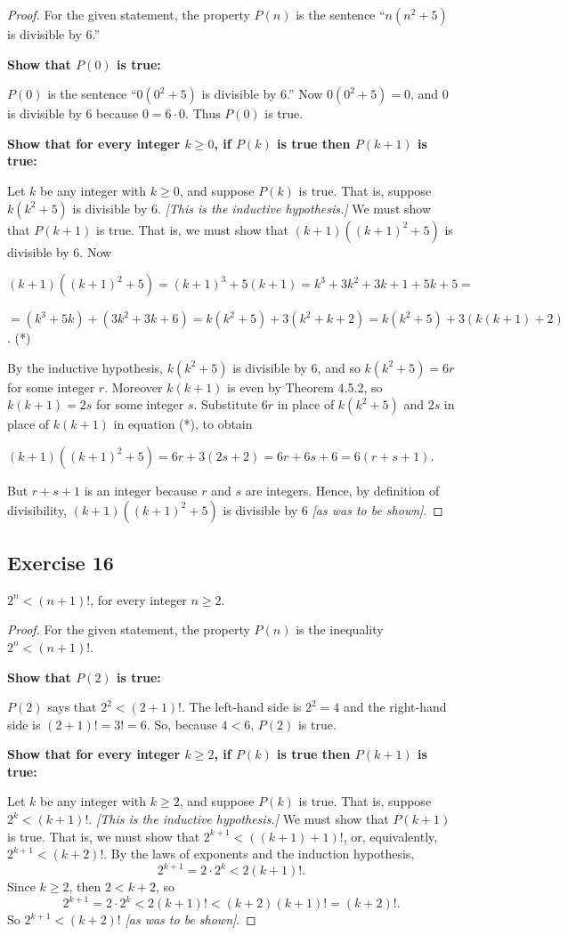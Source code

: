 \documentclass[14pt]{extarticle}
\begin{document}
\begin{proof}
For the given statement, the property $P(n)$ is the sentence “$n(n^2 + 5)$ is divisible by 6.” 

{\bf Show that $P(0)$ is true:} 

$P(0)$ is the sentence “$0(0^2 + 5)$ is divisible by 6.” Now $0(0^2 + 5) = 0$, and 0 is divisible by 6 because $0 = 6 \cdot 0$. Thus $P(0)$ is true. 

{\bf Show that for every integer $k \geq 0$, if $P(k)$ is true then $P(k + 1)$ is true:} 

Let $k$ be any integer with $k \geq 0$, and suppose $P(k)$ is true. That is, suppose $k(k^2 + 5)$ is divisible by 6. {\it [This is the inductive hypothesis.]} We must show that $P(k + 1)$ is true. That is, we must show that $(k+1)((k+1)^2 + 5)$ is divisible by 6. Now 

$(k+1)((k+1)^2 + 5) = (k+1)^3 + 5(k+1) = k^3 + 3k^2 + 3k + 1 + 5k + 5 =$

$= (k^3 + 5k) + (3k^2 + 3k + 6) = k(k^2 + 5) + 3(k^2 + k + 2) = k(k^2 + 5) + 3(k(k+1) + 2)$. (*)

By the inductive hypothesis, $k(k^2 + 5)$ is divisible by 6, and so $k(k^2 + 5) = 6r$ for some integer $r$. Moreover $k(k+1)$ is even by Theorem 4.5.2, so $k(k+1) = 2s$ for some integer $s$. Substitute $6r$ in place of $k(k^2 + 5)$ and $2s$ in place of $k(k+1)$ in equation (*), to obtain 

$(k+1)((k+1)^2 + 5) = 6r + 3(2s + 2) = 6r + 6s + 6 = 6(r + s + 1)$.

But $r + s + 1$ is an integer because $r$ and $s$ are integers. Hence, by definition of divisibility, $(k + 1)((k + 1)^2 + 5)$ is divisible by 6 {\it [as was to be shown]}.
\end{proof}

\subsection{Exercise 16}
$2^n < (n + 1)!$, for every integer $n \geq 2$.

\begin{proof}
For the given statement, the property $P(n)$ is the inequality $2^n < (n + 1)!$. 

{\bf Show that $P(2)$ is true:} 

$P(2)$ says that $2^2 < (2 + 1)!$. The left-hand side is $2^2 = 4$ and the right-hand side is $(2+1)! = 3! = 6$. So, because $4 < 6$, $P(2)$ is true. 

{\bf Show that for every integer $k \geq 2$, if $P(k)$ is true then $P(k + 1)$ is true:} 

Let $k$ be any integer with $k \geq 2$, and suppose $P(k)$ is true. That is, suppose $2^k < (k + 1)!$. {\it [This is the inductive hypothesis.]} We must show that $P(k + 1)$ is true. That is, we must show that $2^{k+1} < ((k+1) + 1)!$, or, equivalently, $2^{k+1} < (k + 2)!$. By the laws of exponents and the induction hypothesis,
\[
2^{k+1} = 2 \cdot 2^k < 2(k+1)!.
\]
Since $k \geq 2$, then $2 < k+2$, so
\[
2^{k+1} = 2 \cdot 2^k < 2(k+1)! < (k+2)(k+1)! = (k+2)!.
\]
So $2^{k+1} < (k+2)!$ {\it [as was to be shown]}.
\end{proof}
\end{document}
